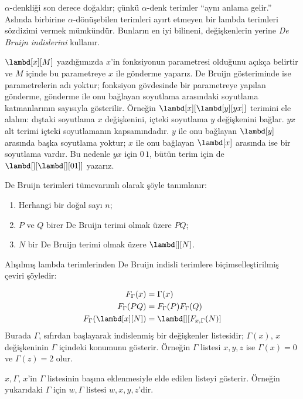 



$\alpha$-denkliği son derece doğaldır; çünkü $\alpha$-denk terimler ``aynı
anlama gelir.'' Aslında birbirine $\alpha$-dönüşebilen terimleri ayırt etmeyen
bir lambda terimleri sözdizimi vermek mümkündür. Bunların en iyi bilineni,
değişkenlerin yerine \emph{De Bruijn indislerini} kullanır.

$\lambd[x][M]$ yazdığımızda $x$'in fonksiyonun parametresi olduğunu açıkça
belirtir ve $M$ içinde bu parametreye $x$ ile gönderme yaparız. De Bruijn
gösteriminde ise parametrelerin adı yoktur; fonksiyon gövdesinde bir
parametreye yapılan gönderme, gönderme ile onu bağlayan soyutlama arasındaki
soyutlama katmanlarının sayısıyla gösterilir. Örneğin
$\lambd[x][\lambd[y][y x]]$ terimini ele alalım: dıştaki soyutlama $x$
değişkenini, içteki soyutlama $y$ değişkenini bağlar. $y x$ alt terimi
içteki soyutlamanın kapsamındadır. $y$ ile onu bağlayan $\lambd[y]$ arasında
başka soyutlama yoktur; $x$ ile onu bağlayan $\lambd[x]$ arasında ise bir
soyutlama vardır. Bu nedenle $y x$ için $0\,1$, bütün terim için de
$\lambd[][\lambd[][01]]$ yazarız.

\begin{defn}
  De Bruijn terimleri tümevarımlı olarak şöyle tanımlanır:
  \begin{enumerate}
  \item Herhangi bir doğal sayı $n$;
  \item $P$ ve $Q$ birer De Bruijn terimi olmak üzere $PQ$;
  \item $N$ bir De Bruijn terimi olmak üzere $\lambd[][N]$.
  \end{enumerate}
\end{defn}

Alışılmış lambda terimlerinden De Bruijn indisli terimlere biçimselleştirilmiş
çeviri şöyledir:
\begin{defn}
  \begin{align*}
    F_\Gamma(x) &= \Gamma(x) \\
    F_\Gamma(PQ) &= F_\Gamma(P)F_\Gamma(Q) \\
    F_\Gamma(\lambd[x][N]) &= \lambd[][F_{x,\Gamma}(N)]
  \end{align*}
  Burada $\Gamma$, sıfırdan başlayarak indislenmiş bir değişkenler listesidir;
  $\Gamma(x)$, $x$ değişkeninin $\Gamma$ içindeki konumunu gösterir. Örneğin
  $\Gamma$ listesi $x,y,z$ ise $\Gamma(x)=0$ ve $\Gamma(z)=2$ olur.

  $x,\Gamma$, $x$'in $\Gamma$ listesinin başına eklenmesiyle elde edilen
  listeyi gösterir. Örneğin yukarıdaki $\Gamma$ için $w,\Gamma$ listesi
  $w,x,y,z$'dir.
\end{defn}

